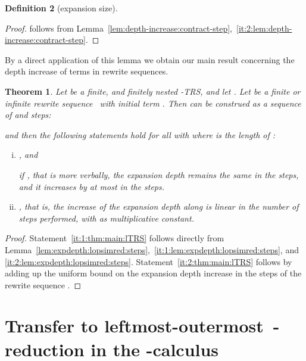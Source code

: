\documentclass[
submission
]{dmtcs-episciences-tampered}
\newcommand{\nb}{\nobreakdash}
\newcommand{\TRS}{TRS}
\newcommand{\lambdacalculus}{\nb-cal\-cu\-lus}
\newcommand{\lo}{left\-most-outer\-most}
\newcommand{\lTRS}{\hspace*{-0.5pt}\nb-\hspace*{-0.5pt}\TRS}
\theoremstyle{plain}
\newtheorem{theorem}{Theorem}
\theoremstyle{definition}
\newtheorem{definition}[theorem]{Definition}
\begin{document}
\begin{definition}[expansion size]
{\begin{proof}
  follows from Lemma~\ref{lem:depth-increase:contract-step},~\eqref{it:2:lem:depth-increase:contract-step}.
\end{proof}

By a direct application of this lemma we obtain our main result concerning
the depth increase of terms in  rewrite sequences.
 

\begin{theorem}\label{thm:main:lTRS}
  Let  be a finite, and finitely nested \lTRS,
  and let . Let  be a finite or infinite  rewrite sequence~ with initial term .
  Then  can be construed as a sequence of  and  steps: 
  \begin{center}
       
  \end{center}
and then the following statements hold for all  with  where  is the length of :
\begin{enumerate}[(i)]\setlength{\itemsep}{0ex}
    \item{}\label{it:1:thm:main:lTRS}
      ,
      and 
      
       if ,
      that is more verbally, the expansion depth remains the same in the  steps, and
      it increases by at most  in the  steps. 
    \item{}\label{it:2:thm:main:lTRS}  
      ,
      that is,
      the increase of the expansion depth along  is linear
      in the number of  steps performed, with  as multiplicative constant. 
  \end{enumerate}  
\end{theorem}





\begin{proof}
  Statement~\eqref{it:1:thm:main:lTRS} 
  follows directly from Lemma~\ref{lem:expdepth:lopsimred:steps},~\eqref{it:1:lem:expdepth:lopsimred:steps}, and \eqref{it:2:lem:expdepth:lopsimred:steps}. 
  Statement~\eqref{it:2:thm:main:lTRS} follows by adding up the uniform bound  
  on the expansion depth increase in the   steps of the rewrite sequence .    
\end{proof}



 
  





\section{Transfer to \lo\ 
         \nb-reduction in the \lambdacalculus}
  \label{sec:transfer:lambda-calculus}


}
\end{definition}
\end{document}
